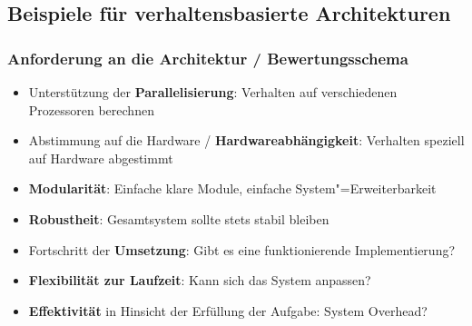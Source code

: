 \subsection{Beispiele für verhaltensbasierte Architekturen}

\subsubsection{Anforderung an die Architektur / Bewertungsschema}
\begin{itemize}
	\item Unterstützung der \textbf{Parallelisierung}: Verhalten auf verschiedenen Prozessoren berechnen
	\item Abstimmung auf die Hardware / \textbf{Hardwareabhängigkeit}: Verhalten speziell auf Hardware abgestimmt
	\item \textbf{Modularität}: Einfache klare Module, einfache System"=Erweiterbarkeit
	\item \textbf{Robustheit}: Gesamtsystem sollte stets stabil bleiben
	\item Fortschritt der \textbf{Umsetzung}: Gibt es eine funktionierende Implementierung?
	\item \textbf{Flexibilität zur Laufzeit}: Kann sich das System anpassen?
	\item \textbf{Effektivität} in Hinsicht der Erfüllung der Aufgabe: System Overhead?
\end{itemize}

